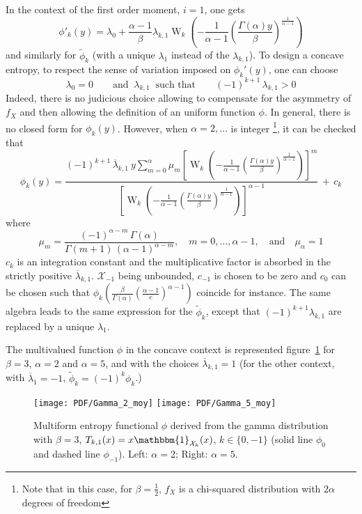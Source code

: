 \documentclass[english]{elsarticle}
\theoremstyle{definition}
\theoremstyle{plain}
\theoremstyle{plain}
\def\X{\mathcal{X}}
\def\un{\mathbbm{1}}
\def\W{\operatorname{W}}
\begin{document}
In the context of the first order moment, $i=1$, one gets 
\[
\phi'_{k}(y)=\lambda_{0}+\frac{\alpha-1}{\beta}\lambda_{k,1}\W_{k}\left(-\frac{1}{\alpha-1}\left(\frac{\Gamma(\alpha)y}{\beta}\right)^{\frac{1}{\alpha-1}}\right)
\]
and similarly for $\widetilde{\phi}_{k}$ (with a unique $\lambda_{1}$
instead of the $\lambda_{k,1}$). To design a concave entropy, to
respect the sense of variation imposed on $\phi_{k}'(y)$, one can
choose 
\[
\lambda_{0}=0\qquad\mbox{and }\:\lambda_{k,1}\:\mbox{ such that}\qquad(-1)^{k+1}\,\lambda_{k,1}>0
\]
Indeed, there is no judicious choice allowing to compensate for the
asymmetry of $f_{X}$ and then allowing the definition of an uniform
function $\phi$. In general, there is no closed form for $\phi_{k}(y)$.
However, when $\alpha=2,\ldots$ is integer%
\footnote{Note that in this case, for $\beta=\frac{1}{2}$, $f_{X}$ is a chi-squared
distribution with $2\alpha$ degrees of freedom%
}, it can be checked that 
\[
\phi_{k}(y)=\frac{{\displaystyle (-1)^{k+1}\,\overline{\lambda}_{k,1}\: y\sum_{m=0}^{\alpha}\mu_{m}\left[\W_{k}\left(-\frac{1}{\alpha-1}\left(\frac{\Gamma(\alpha)y}{\beta}\right)^{\frac{1}{\alpha-1}}\right)\right]^{m}}}{\left[\W_{k}\left(-\frac{1}{\alpha-1}\left(\frac{\Gamma(\alpha)y}{\beta}\right)^{\frac{1}{\alpha-1}}\right)\right]^{\alpha-1}}\,+\, c_{k}
\]
where 
\[
\mu_{m}=\frac{(-1)^{\alpha-m}\,\Gamma(\alpha)}{\Gamma(m+1)\,(\alpha-1)^{\alpha-m}},\quad m=0,\ldots,\alpha-1,\quad\mbox{and}\quad\mu_{\alpha}=1
\]
$c_{k}$ is an integration constant and the multiplicative factor
is absorbed in the strictly positive $\overline{\lambda}_{k,1}$.
$\X_{-1}$ being unbounded, $c_{-1}$ is chosen to be zero and $c_{0}$
can be chosen such that $\phi_{k}\left(\frac{\beta}{\Gamma(\alpha)}\left(\frac{\alpha-1}{e}\right)^{\alpha-1}\right)$
coincide for instance. The same algebra leads to the same expression
for the $\widetilde{\phi}_{k}$, except that $(-1)^{k+1}\lambda_{k,1}$
are replaced by a unique $\lambda_{1}$.

The multivalued function $\phi$ in the concave context is represented
figure~\ref{fig:Entropy-gamma-moy} for $\beta=3$, $\alpha=2$ and
$\alpha=5$, and with the choices $\overline{\lambda}_{k,1}=1$ (for
the other context, with $\overline{\lambda}_{1}=-1$, $\widetilde{\phi}_{k}=(-1)^{k}\phi_{k}$.)
\begin{figure}[htbp]
\centerline{ \texttt{[image: PDF/Gamma\_2\_moy]} \hspace{2mm}
\texttt{[image: PDF/Gamma\_5\_moy]}} \caption{Multiform entropy functional $\phi$ derived from the gamma distribution
with $\beta=3$, $T_{k,1}(x)=x\un_{\X_{k}}(x)$, $k\in\{0,-1\}$ (solid
line $\phi_{0}$ and dashed line $\phi_{-1}$). Left: $\alpha=2$;
Right: $\alpha=5$.}


\label{fig:Entropy-gamma-moy} 
\end{figure}
\end{document}
